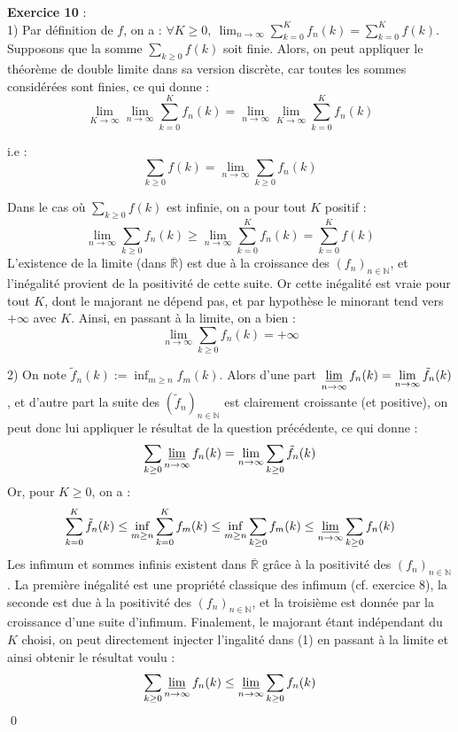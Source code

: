 \documentclass[11pt,a4paper]{article}
\begin{document}
\textbf{Exercice 10} : \\

1) Par définition de $f$, on a : $\forall K \geq 0, \ \displaystyle \lim_{n\to \infty}  \sum_{k = 0}^K f_n(k)=\sum^K_{k = 0} f(k)$. \\

 Supposons que la somme $\displaystyle \sum_{k \geq 0} f(k)$ soit finie. Alors, on peut appliquer le théorème de double limite dans sa version discrète, car toutes les sommes considérées sont finies, ce qui donne : 
 \[\lim_{K \to \infty} \lim_{n\to \infty}  \sum_{k = 0}^K f_n(k) = \lim_{n\to \infty}  \lim_{K \to \infty} \sum_{k = 0}^K f_n(k)\]
 
 i.e : \[\displaystyle \sum_{k \geq 0} f(k) =  \lim_{n\to \infty} \sum_{k \geq 0} f_n(k) \]
 
 Dans le cas où $\displaystyle \sum_{k \geq 0} f(k)$ est infinie, on a pour tout $K$ positif : \[ \displaystyle \lim_{n\to \infty} \sum_{k \geq 0} f_n(k) \geq \lim_{n\to \infty} \sum_{k = 0}^K f_n(k) = \sum_{k = 0}^K f(k) \] L'existence de la limite (dans $\overline{\mathbb{R}} $) est due à la croissance des $(f_n)_{n\in \mathbb{N}}$, et l'inégalité provient de la positivité de cette suite. Or cette inégalité est vraie pour tout $K$, dont le majorant ne dépend pas, et par hypothèse le minorant tend vers $+\infty$ avec $K$. Ainsi, en passant à la limite, on a bien :
\[ \lim_{n\to \infty} \sum_{k \geq 0} f_n(k) = + \infty\]

2) On note $\displaystyle \tilde{f}_n(k) := \inf_{m\geq n} f_m(k)$. Alors d'une part $\displaystyle \varliminf_{n\to \infty}{f_n(k)} = \lim_{n \to \infty} \tilde{f}_n(k)$, et d'autre part la suite des $(\tilde{f}_n)_{n\in \mathbb{N}}$ est clairement croissante (et positive), on peut donc lui appliquer le résultat de la question précédente, ce qui donne : 
\begin{equation}
\sum_{k\geq 0} \varliminf_{n\to \infty}{f_n(k)} = \lim_{n \to \infty} \sum_{k \geq 0} \tilde{f}_n(k) 
\end{equation}
Or, pour $K\geq 0$, on a : \[\sum_{k = 0}^K \tilde{f}_n(k) \leq \inf_{m\geq n}\sum_{k = 0}^K f_m(k) \leq \inf_{m\geq n}\sum_{k \geq 0} f_m(k) \leq\varliminf_{n\to \infty} \sum_{k\geq 0} {f_n(k)}  \]
Les infimum et sommes infinis existent dans  $\overline{\mathbb{R}} $ grâce à la positivité des $(f_n)_{n\in \mathbb{N}}$. La première inégalité est une propriété classique des infimum (cf. exercice 8), la seconde est due à la positivité des $(f_n)_{n\in \mathbb{N}}$, et la troisième est donnée par la croissance d'une suite d'infimum. Finalement, le majorant étant indépendant du $K$ choisi, on peut directement injecter l'ingalité dans (1) en passant à la limite et ainsi obtenir le résultat voulu : 
\[\sum_{k\geq 0} \varliminf_{n\to \infty}{f_n(k)} \leq \varliminf_{n\to \infty} \sum_{k\geq 0} {f_n(k)}  \]
\qed
\end{document}
